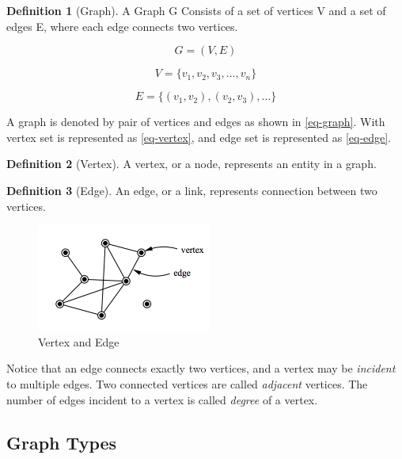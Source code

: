 \documentclass{article}
\theoremstyle{plain}%
\theoremstyle{definition}
\newtheorem{defn}{Definition}[section]
\theoremstyle{remark}
\begin{document}
	\begin{defn}[Graph]
		A Graph G Consists of a set of vertices V and a set of edges E, where each edge connects two vertices.
	\end{defn}

	\begin{equation}\label{eq-graph}
		G = (V, E)
	\end{equation}

	\begin{equation}\label{eq-vertex}
		V=\{v_1, v_2, v_3, ..., v_n\}
	\end{equation}

	\begin{equation}\label{eq-edge}
		E=\{(v_1,v_2), (v_2,v_3), ... \}
	\end{equation}

	A graph is denoted by pair of vertices and edges as shown in \eqref{eq-graph}.
	With vertex set is represented as \eqref{eq-vertex}, and edge set is represented as \eqref{eq-edge}.

	\begin{defn}[Vertex]
		A vertex, or a node, represents an entity in a graph.
	\end{defn}

	\begin{defn}[Edge]
		An edge, or a link, represents connection between two vertices.
	\end{defn}

	\begin{figure}[htbp]
		\center
		\includegraphics[scale=0.8]{img/graph-vertex-edge.png}
		\caption{Vertex and Edge}
	\end{figure}

	Notice that an edge connects exactly two vertices, and a vertex may be \textit{incident} to multiple edges.
	Two connected vertices are called \textit{adjacent} vertices.
	The number of edges incident to a vertex is called \textit{degree} of a vertex.


	\subsection{Graph Types}
\end{document}
